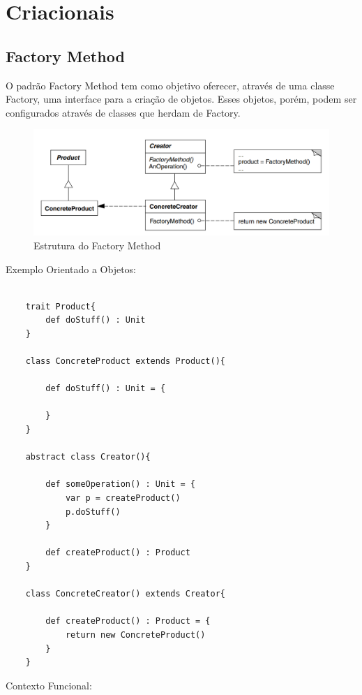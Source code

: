 \section{Criacionais}

\subsection{Factory Method}

O padrão Factory Method tem como objetivo oferecer, através de uma 
classe Factory, uma interface para a criação de objetos. Esses objetos, 
porém, podem ser configurados através de classes que herdam de Factory.


\begin{figure}[htb]
	\caption{\label{fig_grafico}Estrutura do Factory Method}
	\begin{center}
	    \includegraphics[scale=0.5]{5_padroes-contexto-funcional/5.1_criacionais/5.1.1_factory-method/diagram.png}
	\end{center}
\end{figure}

Exemplo Orientado a Objetos:

\begin{lstlisting}[caption={Factory Method Orientado a Objetos},label=oofactory]
    
    trait Product{
        def doStuff() : Unit
    }

    class ConcreteProduct extends Product(){

        def doStuff() : Unit = {
            
        }
    }

    abstract class Creator(){

        def someOperation() : Unit = {
            var p = createProduct()
            p.doStuff()
        }

        def createProduct() : Product
    }

    class ConcreteCreator() extends Creator{

        def createProduct() : Product = {
            return new ConcreteProduct()
        }
    }

\end{lstlisting}

Contexto Funcional:

\begin{lstlisting}[caption={Factory Method Funcional},label=fpfactory]
    
    

\end{lstlisting}